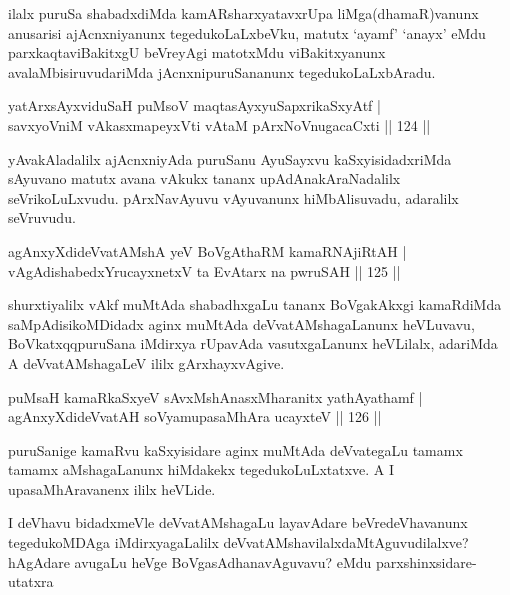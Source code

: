 \begin{artha}
ilalx puruSa shabadxdiMda kamARsharxyatavxrUpa liMga(dhamaR)vanunx anusarisi ajAcnxniyanunx tegedukoLaLxbeVku, matutx `ayamf' `anayx' eMdu parxkaqtaviBakitxgU beVreyAgi matotxMdu viBakitxyanunx avalaMbisiruvudariMda jAcnxnipuruSananunx tegedukoLaLxbAradu.
\end{artha}

\begin{shl}
yatArxsAyxviduSaH puMsoV maqtasAyx\s \s yuSapxrikaSxyAtf |\\
savxyoVniM vAkasxmapeyxVti vAtaM pArxNoV\s nugacaCxti \hfill || 124 ||
\end{shl}

\begin{artha}
yAvakAladalilx ajAcnxniyAda puruSanu AyuSayxvu kaSxyisidadxriMda sAyuvano matutx avana vAkukx tananx upAdAnakAraNadalilx seVrikoLuLxvudu. pArxNavAyuvu vAyuvanunx hiMbAlisuvadu, adaralilx seVruvudu.
\end{artha}




\begin{shl}
agAnxyXdideVvatAMshA yeV BoVgAthaRM kamaRNA\s jiRtAH |\\
vAgAdishabedxYrucayxnetxV ta EvAtarx na pwruSAH \hfill || 125 ||
\end{shl}

\begin{artha}
shurxtiyalilx vAkf muMtAda shabadhxgaLu tananx BoVgakAkxgi kamaRdiMda saMpAdisikoMDidadx aginx muMtAda deVvatAMshagaLanunx heVLuvavu, BoVkatxqqpuruSana iMdirxya rUpavAda vasutxgaLanunx heVLilalx, adariMda A deVvatAMshagaLeV ililx gArxhayxvAgive.
\end{artha}

\begin{shl}
puMsaH kamaRkaSxyeV sAvxMshAnasxMharanitx yathAyathamf |\\
agAnxyXdideVvatAH soV\s yamupasaMhAra ucayxteV \hfill || 126 ||
\end{shl}

\begin{artha}
puruSanige kamaRvu kaSxyisidare aginx muMtAda deVvategaLu tamamx tamamx aMshagaLanunx hiMdakekx tegedukoLuLxtatxve. A I upasaMhAravanenx ililx heVLide.
\end{artha}

\begin{artha}
I deVhavu bidadxmeVle deVvatAMshagaLu layavAdare beVredeVhavanunx tegedukoMDAga iMdirxyagaLalilx deVvatAMshavilalxdaMtAguvudilalxve? hAgAdare avugaLu heVge BoVgasAdhanavAguvavu? eMdu parxshinxsidare- utatxra 
\end{artha}

